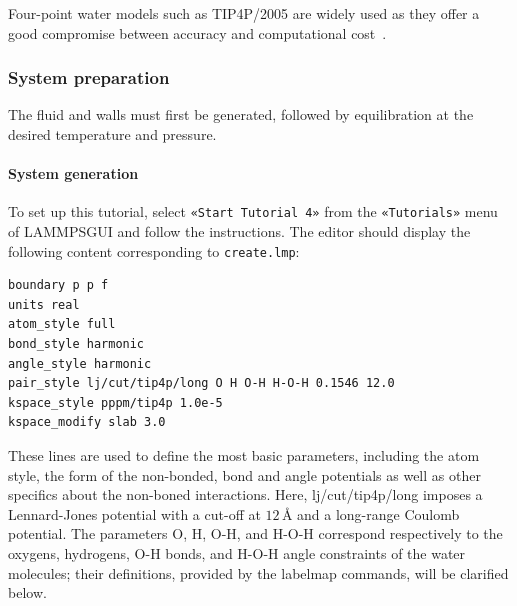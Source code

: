 \documentclass[9pt,tutorial]{livecoms}
\newcommand{\lmpcmd}[1]{\colorbox{listing}{\textcolor{command}{\small{#1}}}} %
\newcommand{\flecmd}[1]{\textcolor{command}{\texttt{#1}}} %
\newcommand{\guicmd}[1]{\textcolor{command}{\texttt{«#1»}}} %
\newcommand{\lammpsgui}{\textsf{LAMMPS\textendash GUI}}
\begin{document}
\begin{note}
Four-point water models such as TIP4P/2005 are widely used as they offer a
good compromise between accuracy and computational cost~\cite{kadaoluwa2021systematic}.
\end{note}

\subsubsection{System preparation}

The fluid and walls must first be generated, followed by equilibration at the
desired temperature and pressure.

\paragraph{System generation}

To set up this tutorial, select \guicmd{Start Tutorial 4} from the
\guicmd{Tutorials} menu of \lammpsgui{} and follow the instructions.
The editor should display the following content corresponding to \flecmd{create.lmp}:
\begin{lstlisting}
boundary p p f
units real
atom_style full
bond_style harmonic
angle_style harmonic
pair_style lj/cut/tip4p/long O H O-H H-O-H 0.1546 12.0
kspace_style pppm/tip4p 1.0e-5
kspace_modify slab 3.0
\end{lstlisting}
These lines are used to define the most basic parameters, including the
{\color{blue}atom style, the form of the non-bonded, bond and angle potentials as well as
other specifics about the non-boned interactions}.  Here, \lmpcmd{lj/cut/tip4p/long} 
imposes a Lennard-Jones potential with a cut-off at $12\,\text{\AA{}}$ and a long-range 
Coulomb potential.  {\color{blue} The parameters \lmpcmd{O}, \lmpcmd{H}, \lmpcmd{O-H}, 
and \lmpcmd{H-O-H} correspond respectively to the oxygens, hydrogens, O-H bonds, and 
H-O-H angle constraints of the water molecules; their definitions, provided by the 
\lmpcmd{labelmap} commands, will be clarified below.}
\end{document}
